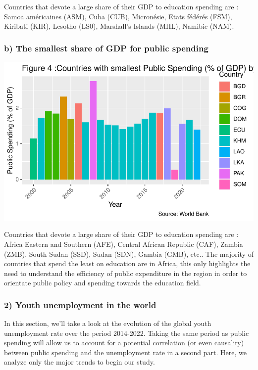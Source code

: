 \documentclass[
  letterpaper,
  DIV=11,
  numbers=noendperiod]{scrartcl}
\begin{document}
Countries that devote a large share of their GDP to education spending
are : Samoa américaines (ASM), Cuba (CUB), Micronésie, Etats fédérés
(FSM), Kiribati (KIR), Lesotho (LS0), Marshall's Islands (MHL), Namibie
(NAM).

\hypertarget{b-the-smallest-share-of-gdp-for-public-spending}{%
\subsubsection{b) The smallest share of GDP for public
spending}\label{b-the-smallest-share-of-gdp-for-public-spending}}

\includegraphics{Projet-BM_files/figure-pdf/unnamed-chunk-12-1.pdf}

Countries that devote a large share of their GDP to education spending
are : Africa Eastern and Southern (AFE), Central African Republic (CAF),
Zambia (ZMB), South Sudan (SSD), Sudan (SDN), Gambia (GMB), etc.. The
majority of countries that spend the least on education are in Africa,
this only highlights the need to understand the efficiency of public
expenditure in the region in order to orientate public policy and
spending towards the education field.

\hypertarget{youth-unemployment-in-the-world}{%
\subsubsection{2) Youth unemployment in the
world}\label{youth-unemployment-in-the-world}}

In this section, we'll take a look at the evolution of the global youth
unemployment rate over the period 2014-2022. Taking the same period as
public spending will allow us to account for a potential correlation (or
even causality) between public spending and the unemployment rate in a
second part. Here, we analyze only the major trends to begin our study.
\end{document}
